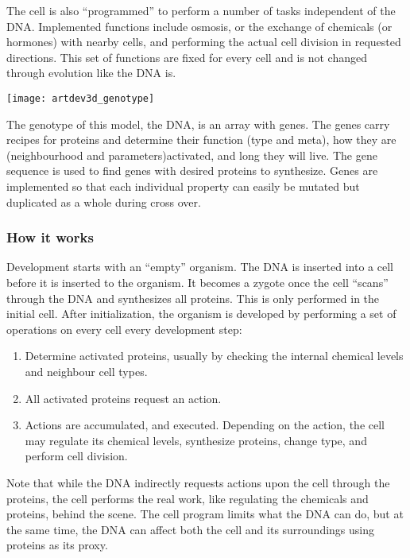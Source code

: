 The cell is also ``programmed'' to perform a number of tasks independent of the DNA. Implemented functions include osmosis, or the exchange of chemicals (or hormones) with nearby cells, and performing the actual cell division in requested directions. This set of functions are fixed for every cell and is not changed through evolution like the DNA is.

\begin{center}\texttt{[image: artdev3d\_genotype]}\end{center}

The genotype of this model, the DNA, is an array with genes. The genes carry recipes for proteins and determine their function (type and meta), how they are (neighbourhood and parameters)activated, and long they will live. The gene sequence is used to find genes with desired proteins to synthesize. Genes are implemented so that each individual property can easily be mutated but duplicated as a whole during cross over.

\subsubsection{How it works}
Development starts with an ``empty'' organism. The DNA is inserted into a cell before it is inserted to the organism. It becomes a zygote once the cell ``scans'' through the DNA and synthesizes all proteins. This is only performed in the initial cell. After initialization, the organism is developed by performing a set of operations on every cell every development step:

\begin{enumerate}
	\itemsep=0pt
	\item Determine activated proteins, usually by checking the internal chemical levels and neighbour cell types.
	\item All activated proteins request an action.
	\item Actions are accumulated, and executed. Depending on the action, the cell may regulate its chemical levels, synthesize proteins, change type, and perform cell division.
\end{enumerate}

Note that while the DNA indirectly requests actions upon the cell through the proteins, the cell performs the real work, like regulating the chemicals and proteins, behind the scene. The cell program limits what the DNA can do, but at the same time, the DNA can affect both the cell and its surroundings using proteins as its proxy.

